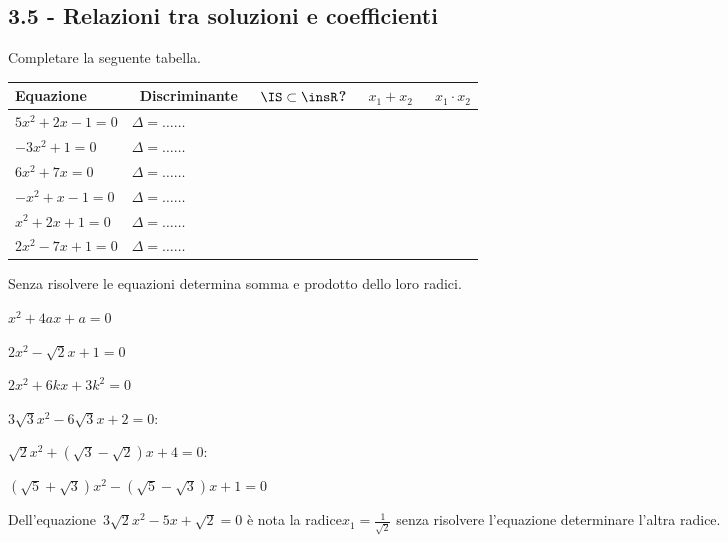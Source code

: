 \subsection*{3.5 - Relazioni tra soluzioni e coefficienti}

\begin{esercizio}
 \label{ese:3.67}
Completare la seguente tabella.

 \begin{tabular*}{.9\textwidth}{@{\extracolsep{\fill}}*{5}{l}}
 \toprule
 Equazione &~Discriminante&~$\IS\subset\insR$? &~$x_1 + x_2$ &~$x_1 \cdot x_2$\\
\midrule
$5 x^{2} + 2 x-1 = 0$&$\Delta=\ldots \ldots$ & & &\\
$- 3 x^{2} + 1 = 0$&$\Delta=\ldots \ldots$ & & &\\
$6 x^{2} + 7 x = 0$&$\Delta=\ldots \ldots$ & & &\\
$- x^{2} + x-1 = 0$&$\Delta=\ldots \ldots$ & & &\\
$x^{2} + 2 x + 1 = 0$&$\Delta=\ldots \ldots$ & & &\\
$2 x^{2}-7 x + 1 = 0$&$\Delta=\ldots \ldots$ & & &\\
\bottomrule
 \end{tabular*}

\end{esercizio}

\begin{esercizio}
 \label{ese:3.68}
Senza risolvere le equazioni determina somma e prodotto dello loro radici.
\begin{multicols}{2}
\begin{enumeratea}
\item$x^{2} + 4ax + a = 0$
\item$2x^{2}-\sqrt{2} x + 1 = 0$
\item$2x^{2} + 6kx + 3k^{2} = 0$
\item$3 \sqrt{3} x^{2}-6 \sqrt{3} x + 2 = 0$:
\item$\sqrt{2} x^{2} + (\sqrt{3}-\sqrt{2}) x + 4 = 0$:
\item$(\sqrt{5} + \sqrt{3}) x^{2}-(\sqrt{5}-\sqrt{3}) x + 1= 0$
\end{enumeratea}
\end{multicols}
\end{esercizio}

\begin{esercizio}
 \label{ese:3.69}
Dell'equazione~$3 \sqrt{2} x^{2}-5 x + \sqrt{2} = 0$ è nota la radice$x_{1} = 
\frac{1}{\sqrt{2}}$ senza risolvere l'equazione determinare l'altra radice.
\end{esercizio}

